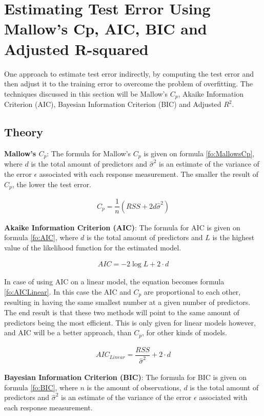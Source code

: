 \section{Estimating Test Error Using Mallow's Cp, AIC, BIC and Adjusted R-squared}\label{sc:estimatingTestError}%
One approach to estimate test error indirectly, by computing the test error and then adjust it to the training error to overcome the problem of overfitting. The techniques discussed in this section will be Mallow's $C_p$, Akaike Information Criterion (AIC), Bayesian Information Criterion (BIC) and Adjusted $R^2$.

\subsection{Theory}
\textbf{Mallow's $C_p$}: The formula for Mallow's $C_p$ is given on formula \ref{fo:MallowsCp}, where $d$ is the total amount of predictors and $\hat{\sigma}^2$ is an estimate of the variance of the error $\epsilon$ associated with each response measurement. The smaller the result of $C_p$, the lower the test error. 

\begin{align}\label{fo:MallowsCp}
	C_p = \dfrac{1}{n} (RSS + 2 d \hat{\sigma}^2)
\end{align}

\textbf{Akaike Information Criterion (AIC)}: The formula for AIC is given on formula \ref{fo:AIC}, where $d$ is the total amount of predictors and $L$ is the highest value of the likelihood function for the estimated model.

\begin{align}\label{fo:AIC}
	AIC = -2 \log L + 2 \cdot d
\end{align}

In case of using AIC on a linear model, the equation becomes formula \ref{fo:AICLinear}. In this case the AIC and $C_p$ are proportional to each other, resulting in having the same smallest number at a given number of predictors. The end result is that these two methods will point to the same amount of predictors being the most efficient. This is only given for linear models however, and AIC will be a better approach, than $C_p$, for other kinds of models.
 
\begin{align}\label{fo:AICLinear}
	AIC_{Linear} = \dfrac{RSS}{\hat{\sigma}^2} + 2 \cdot d
\end{align}

\textbf{Bayesian Information Criterion (BIC)}: The formula for BIC is given on formula \ref{fo:BIC}, where $n$ is the amount of observations, $d$ is the total amount of predictors and $\hat{\sigma}^2$ is an estimate of the variance of the error $\epsilon$ associated with each response measurement.


